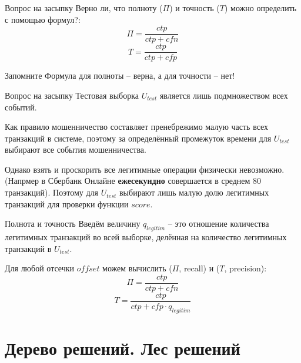 	\begin{frame}{Вопрос на засыпку}
	Верно ли, что полноту ($\Pi$) и точность ($T$) можно определить с помощью формул?:
	\begin{equation*}
	\Pi = \frac{ctp}{ctp + cfn}
	\end{equation*}
	\begin{equation*}
	T = \frac{ctp}{ctp + cfp}
	\end{equation*}
	 \begin{block}{Запомните}
		Формула для полноты -- верна, а для точности -- нет!
	\end{block}
	\end{frame}

	\begin{frame}{Вопрос на засыпку}
	Тестовая выборка $U_{test}$ является лишь подмножеством всех событий. 
	
	Как правило мошенничество составляет пренебрежимо малую часть всех транзакций в системе,
	поэтому за определённый промежуток времени для $U_{test}$ выбирают все события мошенничества.
	
	Однако взять и проскорить все легитимные операции физически невозможно.
	(Напрмер в Сбербанк Онлайне \textbf{ежесекундно} совершается в среднем 80 транзакций).
	Поэтому для $U_{test}$ выбирают лишь малую долю легитимных транзакций для проверки функции
	$score$.
	\end{frame}

	\begin{frame}{Полнота и точность}
	Введём величину $q_{legitim}$ -- это отношение количества легитимных транзакций во всей выборке, 
	делённая на количество легитимных транзакций в  $U_{test}$.
	
	Для любой отсечки $offset$ можем вычислить  ($\Pi$, recall) и  ($T$, precision):
		\begin{equation}\label{eq:recall_by_counts}
		\Pi = \frac{ctp}{ctp + cfn}
		\end{equation}
		\begin{equation}\label{eq:presicionl_by_counts}
		T = \frac{ctp}{ctp + cfp \cdot q_{legitim}}
		\end{equation}
	\end{frame}



\section{Дерево решений. Лес решений}\label{section:tree_forest}

